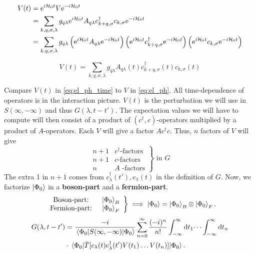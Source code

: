 \begin{align*} 
V(t) &= \e^{i\Ha_0 t}V\e^{-i\Ha_0 t} \\
&=  \sum_{k,q, \sigma, \lambda}g_{q\lambda}\e^{i\Ha_0 t}A_{q\lambda} c_{k+q,\sigma}^\dagger c_{k,\sigma}\e^{-i\Ha_0 t} \\
&= \sum_{k,q, \sigma, \lambda}g_{q\lambda}\left(\vphantom{c_{k+q,\sigma}^\dagger}\e^{i\Ha_0 t}A_{q\lambda}\e^{-i\Ha_0 t}\right)\left( \e^{i\Ha_0 t}c_{k+q,\sigma}^\dagger\e^{-i\Ha_0 t}\right)\left( \vphantom{c_{k+q,\sigma}^\dagger} \e^{i\Ha_0 t}c_{k,\sigma}\e^{-i\Ha_0 t}\right)
\end{align*}
\begin{tcolorbox}
	\begin{equation}
	\label{eq:el_ph_time}
		V(t) = \sum_{k, q, \sigma, \lambda}g_{q\lambda}A_{q\lambda}(t) c_{k+q,\sigma}^\dagger(t) c_{k,\sigma}(t)
	\end{equation}
\end{tcolorbox}
Compare $V(t)$ in \cref{eq:el_ph_time} to $V$ in \cref{eq:el_ph}. All time-dependence of operators is in the interaction picture. $V(t)$ is the perturbation we will use in $ S(\infty, -\infty) $ and thus $G(\lambda, t-t')$. The expectation values we will have to compute will then consist of a product of $ (c^\dagger, c)$-operators multiplied by a product of $ A$-operators. 
Each $ V $ will give a factor $ Ac^\dagger c $. Thus, $n$ factors of $V$ will give
\begin{equation} 
\left.\begin{array}{cc}
n+1 & c^\dagger \text{-factors} \\
n+1 & c \text{-factors} \\
n & A\text{ -factors}
\end{array}\right\} \text{ in } G
\end{equation}
The extra 1 in $n+1$ comes from $c_\lambda^\dagger(t'), c_\lambda(t)$  in the definition of $G$. Now, we factorize $\ket{\Phi_0}$ in a \textbf{boson-part} and a \textbf{fermion-part}. 
\begin{equation} 
\left.\begin{array}{cc}
\text{ Boson-part: } & \ket{\Phi_0}_B \\
\text{ Fermion-part: } & \ket{\Phi_0}_F
\end{array}\right\} \implies \ket{\Phi_0} = \ket{\Phi_0}_B \otimes \ket{\Phi_0}_F.
\end{equation}
\begin{align} 
\begin{split} 
G(\lambda, t-t') &= \frac{-i}{\ev{S(\infty, -\infty)}{\Phi_0}}\sum_{n=0}^{\infty}\frac{(-i)^n}{n!}\int_{-\infty}^{\infty}\dd{t_1}\dots  \int_{-\infty}^{\infty}\dd{t_n} \\
& \cdot \ev{\tilde{T}[c_\lambda(t)c_\lambda^\dagger(t')V(t_1)\dots V(t_n)]}{\Phi_0}.
\end{split}
\end{align}
